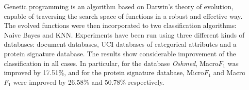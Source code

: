 Genetic programming is an algorithm based on Darwin's theory of evolution,
capable of traversing the search space of functions in a robust and effective
way. The evolved functions were then incorporated to two classification
algorithms: Naive Bayes and \textsc{KNN}. Experiments have been run using three 
different kinds of databases: document databases, \textsc{UCI} databases 
of categorical attributes and a protein signature database.
The results show
considerable improvement of the classification in all cases. In particular, for
the database \textit{Oshmed}, Macro$F_1$ was improved by 17.51\%, and for the
protein signature database, Micro$F_1$ and Macro$F_1$ were improved by 26.58\%
and 50.78\% respectively.

